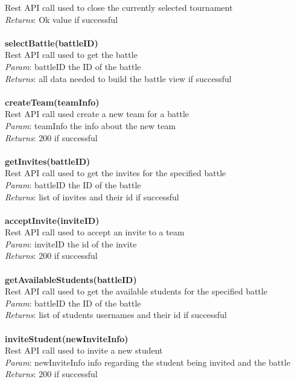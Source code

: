 \documentclass{article}
\begin{document}
Rest API call used to close the currently selected tournament\\
\textit{Returns}: Ok value if successful\\
\\
\textbf{selectBattle(battleID)}\\
Rest API call used to get the battle\\
\textit{Param}: battleID the ID of the battle\\
\textit{Returns}: all data needed to build the battle view if successful\\
\\
\textbf{createTeam(teamInfo)}\\
Rest API call used create a new team for a battle\\
\textit{Param}: teamInfo the info about the new team\\
\textit{Returns}: 200 if successful\\
\\
\textbf{getInvites(battleID)}\\
Rest API call used to get the invites for the specified battle\\
\textit{Param}: battleID the ID of the battle\\
\textit{Returns}: list of invites and their id if successful\\
\\
\textbf{acceptInvite(inviteID)}\\
Rest API call used to accept an invite to a team\\
\textit{Param}: inviteID the id of the invite\\
\textit{Returns}: 200 if successful\\
\\
\textbf{getAvailableStudents(battleID)}\\
Rest API call used to get the available students for the specified battle\\
\textit{Param}: battleID the ID of the battle\\
\textit{Returns}: list of students usernames and their id if successful\\
\\
\textbf{inviteStudent(newInviteInfo)}\\
Rest API call used to invite a new student\\
\textit{Param}: newInviteInfo info regarding the student being invited and the battle\\
\textit{Returns}: 200 if successful\\
\end{document}
